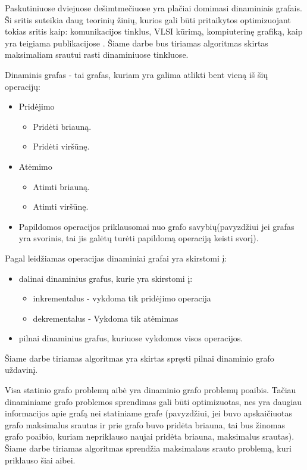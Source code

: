 Paskutiniuose dviejuose dešimtmečiuose yra plačiai domimasi dinaminiais grafais. Ši sritis suteikia daug teorinių žinių, kurios gali būti pritaikytos optimizuojant tokias sritis kaip: komunikacijos tinklus, VLSI kūrimą, kompiuterinę grafiką, kaip yra teigiama publikacijose \cite{DynamicGraphs, DGA}. Šiame darbe bus tiriamas algoritmas skirtas maksimaliam srautui rasti dinaminiuose tinkluose.

Dinaminis grafas - tai grafas, kuriam yra galima atlikti bent vieną iš šių operacijų:
\begin{itemize}
	\item Pridėjimo
	\begin{itemize}
		\item Pridėti briauną.
		\item Pridėti viršūnę.
	\end{itemize}
	\item Atėmimo
	\begin{itemize}
		\item Atimti briauną.
		\item Atimti viršūnę.
	\end{itemize}
	\item  Papildomos operacijos priklausomai nuo grafo savybių(pavyzdžiui jei grafas yra svorinis, tai jis galėtų turėti papildomą operaciją keisti svorį).
\end{itemize}
Pagal leidžiamas operacijas dinaminiai grafai yra skirstomi į:
\begin{itemize}
	\item dalinai dinaminius grafus, kurie yra skirstomi į:
	\begin{itemize}
		\item inkrementalus - vykdoma tik pridėjimo operacija
		\item dekrementalus - Vykdoma tik atėmimas
	\end{itemize}
	\item  pilnai dinaminius grafus, kuriuose vykdomos visos operacijos.
\end{itemize}
Šiame darbe tiriamas algoritmas yra skirtas spręsti pilnai dinaminio grafo uždavinį.

Visa statinio grafo problemų aibė yra dinaminio grafo problemų poaibis. Tačiau dinaminiame grafo problemos sprendimas gali būti optimizuotas, nes yra daugiau informacijos apie grafą nei statiniame grafe (pavyzdžiui, jei buvo apskaičiuotas grafo maksimalus srautas ir prie grafo buvo pridėta briauna, tai bus žinomas grafo poaibio, kuriam nepriklauso naujai pridėta briauna, maksimalus srautas). Šiame darbe tiriamas algoritmas sprendžia maksimalaus srauto problemą, kuri priklauso šiai aibei.


